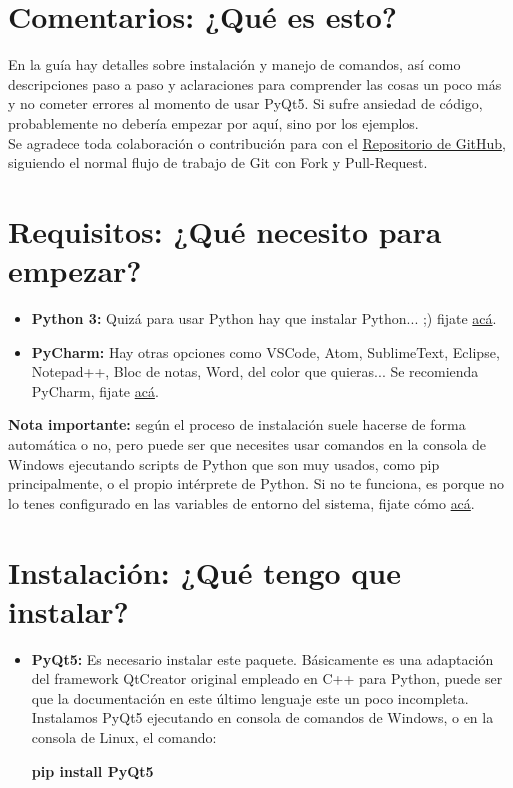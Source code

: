 \section{Comentarios: ¿Qu\'e es esto?}
En la gu\'ia hay detalles sobre instalaci\'on y manejo de comandos, as\'i como descripciones paso a paso y aclaraciones para comprender
las cosas un poco m\'as y no cometer errores al momento de usar PyQt5. Si sufre ansiedad de c\'odigo, probablemente no deber\'ia empezar por aqu\'i, sino por los ejemplos.
\\
Se agradece toda colaboraci\'on o contribuci\'on para con el \href{https://github.com/nicotrozzo/pyqt5-tutorials}{Repositorio de GitHub}, siguiendo el normal flujo de trabajo de Git con Fork y Pull-Request.

\section{Requisitos: ¿Qu\'e necesito para empezar?}

\begin{itemize}
    \item \textbf{Python 3:} Quiz\'a para usar Python hay que instalar Python... ;) fijate \href{https://www.python.org/}{ac\'a}.
    \item \textbf{PyCharm:} Hay otras opciones como VSCode, Atom, SublimeText, Eclipse, Notepad++, Bloc de notas, Word, del color que quieras... Se recomienda PyCharm, fijate \href{https://www.jetbrains.com/pycharm/}{ac\'a}.
\end{itemize}

\textbf{Nota importante:} seg\'un el proceso de instalaci\'on suele hacerse de forma autom\'atica o no, pero puede ser que necesites usar comandos en la consola de Windows ejecutando scripts de Python que son muy usados,
como pip principalmente, o el propio int\'erprete de Python. Si no te funciona, es porque no lo tenes configurado en las variables de entorno del sistema, fijate c\'omo \href{}{ac\'a}.

\section{Instalaci\'on: ¿Qu\'e tengo que instalar?}
\begin{itemize}
    \item \textbf{PyQt5:} Es necesario instalar este paquete. B\'asicamente es una adaptaci\'on del framework QtCreator original empleado en C++ para Python, puede ser que la documentaci\'on en este \'ultimo lenguaje este un poco incompleta.
    Instalamos PyQt5 ejecutando en consola de comandos de Windows, o en la consola de Linux, el comando:
    \begin{center}
        \textbf{pip install PyQt5}
    \end{center}
\end{itemize}

